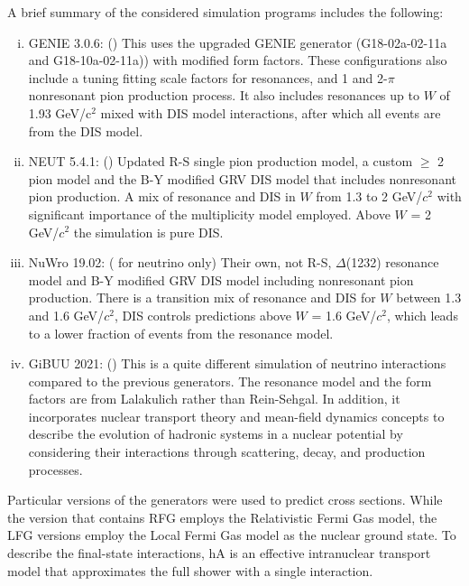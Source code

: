 \documentclass[aps, prd, twocolumn, showpacs, superscriptaddress, floatfix]{revtex4-2}
\begin{document}
A brief summary of the considered simulation programs includes the following:
\begin{enumerate}[(i)]
  \item GENIE 3.0.6: (\cite{GENIE:2022qrc}) This uses the upgraded GENIE generator (G18-02a-02-11a and G18-10a-02-11a)) with modified form factors. These configurations also include a tuning fitting scale factors for resonances, and 1 and 2-$\pi$ nonresonant pion production process. It also includes resonances up to $W$ of 1.93 GeV/c$^2$ mixed with DIS model interactions, after which all events are from the DIS model.
  \item NEUT 5.4.1: (\cite{Hayato:2021heg}) Updated R-S single pion production model, a custom $\geq$ 2 pion model and the B-Y modified GRV DIS model that includes nonresonant pion production. A mix of resonance and DIS in $W$ from 1.3 to 2 GeV/$c^2$ with significant importance of the multiplicity model employed. Above $W$ = 2 GeV/$c^2$ the simulation is pure DIS.
  \item NuWro 19.02: (\cite{Golan:2012rfa} for neutrino only) Their own, not R-S, $\Delta$(1232) resonance model and B-Y modified GRV DIS model including nonresonant pion production. There is a transition mix of resonance and DIS for $W$ between 1.3 and 1.6 GeV/$c^2$, DIS controls predictions above $W$ = 1.6 GeV/$c^2$, which leads to a lower fraction of events from the resonance model.
  \item GiBUU 2021: (\cite{Soplin:2023nxg}) This is a quite different simulation of neutrino interactions compared to the previous generators. The resonance model and the form factors are from Lalakulich \cite{Lalakulich:2010ss} rather than Rein-Sehgal. In addition, it incorporates nuclear transport theory and mean-field dynamics concepts to describe the evolution of hadronic systems in a nuclear potential by considering their interactions through scattering, decay, and production processes. 
\end{enumerate}

Particular versions of the generators were used to predict cross sections. While the version that contains RFG employs the Relativistic Fermi Gas model, the LFG versions employ the Local Fermi Gas model as the nuclear ground state. To describe the final-state interactions, hA is an effective intranuclear transport model that approximates the full shower with a single interaction.
\end{document}
